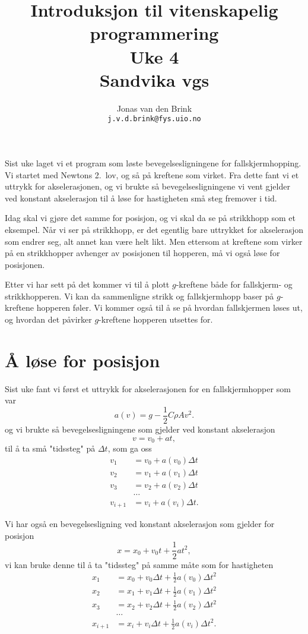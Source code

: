 \documentclass[a4paper, 11pt, notitlepage, english]{article}
\author{Jonas van den Brink \\ \texttt{j.v.d.brink@fys.uio.no}}
\title{Introduksjon til vitenskapelig programmering \\ Uke 4 \\ Sandvika vgs}
\begin{document}
\maketitle

Sist uke laget vi et program som løste bevegelsesligningene for fallskjermhopping. Vi startet med Newtons 2.\ lov, og så på kreftene som virket. Fra dette fant vi et uttrykk for akselerasjonen, og vi brukte så bevegelsesligningene vi vent gjelder ved konstant akselerasjon til å løse for hastigheten små steg fremover i tid.

Idag skal vi gjøre det samme for posisjon, og vi skal da se på strikkhopp som et eksempel. Når vi ser på strikkhopp, er det egentlig bare uttrykket for akselerasjon som endrer seg, alt annet kan være helt likt. Men ettersom at kreftene som virker på en strikkhopper avhenger av posisjonen til hopperen, må vi også løse for posisjonen.

Etter vi har sett på det kommer vi til å plott $g$-kreftene både for fallskjerm- og strikkhopperen. Vi kan da sammenligne strikk og fallskjermhopp baser på $g$-kreftene hopperen føler. Vi kommer også til å se på hvordan fallskjermen løses ut, og hvordan det påvirker $g$-kreftene hopperen utsettes for.

\clearpage

\section*{Å løse for posisjon}
Sist uke fant vi først et uttrykk for akselerasjonen for en fallskjermhopper som var
$$a(v) = g - \frac{1}{2}C\rho A v^2.$$
og vi brukte så bevegelsesligningene som gjelder ved konstant akselerasjon
$$v = v_0 + a t,$$
til å ta små "tidssteg" på $\Delta t$, som ga oss
\begin{align*}
v_1 &= v_0 + a(v_0)\Delta t \\  
v_2 &= v_1 + a(v_1)\Delta t \\
v_3 &= v_2 + a(v_2)\Delta t \\
&\hdots \\
v_{i+1} &= v_i + a(v_i)\Delta t.
\end{align*}

Vi har også en bevegelsesligning ved konstant akselerasjon som gjelder for posisjon
$$x = x_0 + v_0 t + \frac{1}{2}at^2,$$
vi kan bruke denne til å ta "tidssteg" på samme måte som for hastigheten
\begin{align*}
x_1 &= x_0  + v_0 \Delta t + \frac{1}{2} a(v_0) \Delta t^2 \\  
x_2 &= x_1  + v_1 \Delta t + \frac{1}{2} a(v_1) \Delta t^2 \\  
x_3 &= x_2  + v_2 \Delta t + \frac{1}{2} a(v_2) \Delta t^2 \\  
&\hdots \\
x_{i+1} &= x_i + v_i\Delta t + \frac{1}{2} a(v_i)\Delta t^2.
\end{align*}
\end{document}
